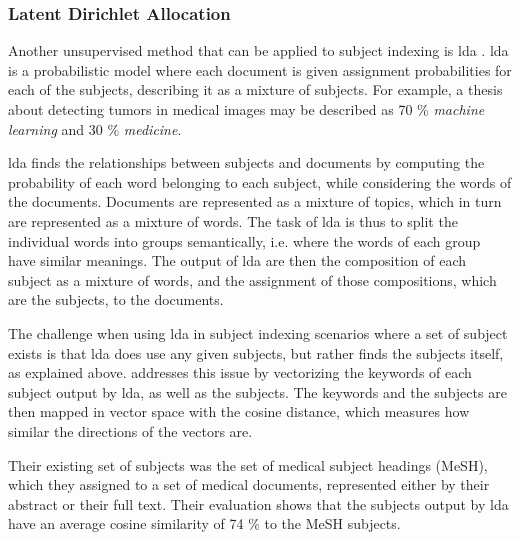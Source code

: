 \subsubsection{Latent Dirichlet Allocation} \label{subject_indexing_lda}

Another unsupervised method that can be applied to subject indexing is \acrfull{lda} \cite{blei2003latent}. \acrshort{lda} is a probabilistic model where each document is given assignment probabilities for each of the subjects, describing it as a mixture of subjects. For example, a thesis about detecting tumors in medical images may be described as 70 \% \textit{machine learning} and 30 \% \textit{medicine}.

\acrshort{lda} finds the relationships between subjects and documents by computing the probability of each word belonging to each subject, while considering the words of the documents. Documents are represented as a mixture of topics, which in turn are represented as a mixture of words. The task of \acrshort{lda} is thus to split the individual words into groups semantically, i.e. where the words of each group have similar meanings. The output of \acrshort{lda} are then the composition of each subject as a mixture of words, and the assignment of those compositions, which are the subjects, to the documents.

The challenge when using \acrshort{lda} in subject indexing scenarios where a set of subject exists is that \acrshort{lda} does use any given subjects, but rather finds the subjects itself, as explained above. \cite{heryawan2021medical} addresses this issue by vectorizing the keywords of each subject output by \acrshort{lda}, as well as the subjects. The keywords and the subjects are then mapped in vector space with the cosine distance, which measures how similar the directions of the vectors are.

Their existing set of subjects was the set of medical subject headings (MeSH), which they assigned to a set of medical documents, represented either by their abstract or their full text. Their evaluation shows that the subjects output by \acrshort{lda} have an average cosine similarity of 74 \% to the MeSH subjects.

